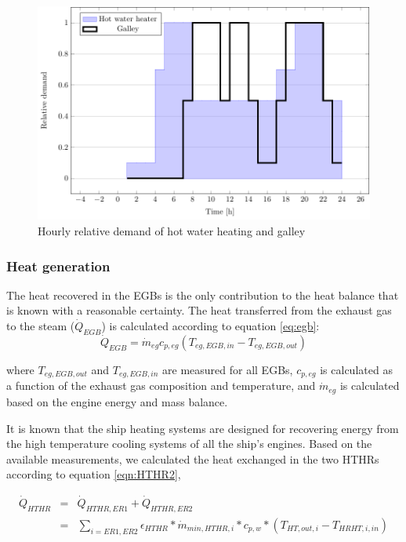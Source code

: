\documentclass[preprint,12pt]{elsarticle}
\begin{document}
\begin{figure}[tbp!]
	\centering
	\includegraphics[width=0.7\linewidth]{Figures/galleyHotWater.pdf}
	\caption{Hourly relative demand of hot water heating and galley}
	\label{fig:galleyhotwater}
\end{figure}

	
	
\subsubsection{Heat generation}
	
The heat recovered in the EGBs is the only contribution to the heat balance that is known with a reasonable certainty. The heat transferred from the exhaust gas to the steam ($\dot{Q}_{EGB}$) is calculated according to equation \ref{eq:egb}:
\begin{equation}
\dot{Q}_{EGB} = \dot{m}_{eg} c_{p,eg} (T_{eg,EGB,in} - T_{eg,EGB,out})
\end{equation}\label{eq:egb}

where $T_{eg,EGB,out}$ and $T_{eg,EGB,in}$ are measured for all EGBs, $c_{p,eg}$ is calculated as a function of the exhaust gas composition and temperature, and $ \dot{m}_{eg} $ is calculated based on the engine energy and mass balance.

It is known that the ship heating systems are designed for recovering energy from the high temperature cooling systems of all the ship's engines. Based on the available measurements, we calculated the heat exchanged in the two HTHRs according to equation \ref{eqn:HTHR2},

\begin{eqnarray}
\dot{Q}_{HTHR} & = & \dot{Q}_{HTHR,ER1} + \dot{Q}_{HTHR,ER2} \label{eqn:HTHR1} \\
& = & \sum_{i=ER1,ER2}{\epsilon_{HTHR} * \dot{m}_{min,HTHR,i} * c_{p,w} * (T_{HT,out,i} - T_{HRHT,i,in})} \label{eqn:HTHR2}
\end{eqnarray}
\end{document}
